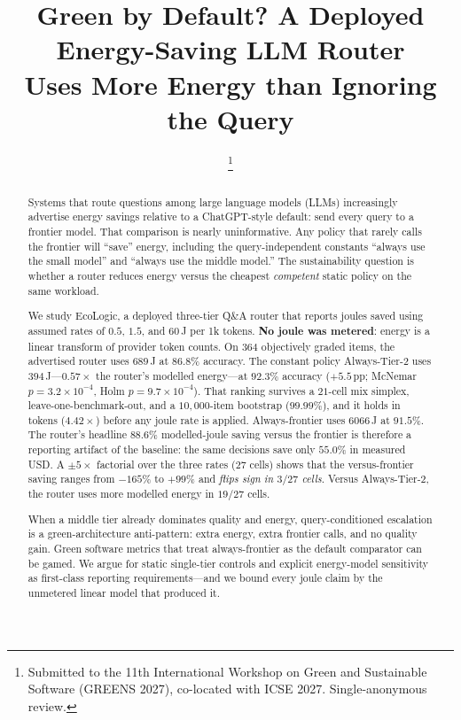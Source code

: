 \documentclass[10pt,conference]{IEEEtran}
\begin{document}
\title{Green by Default? A Deployed Energy-Saving LLM Router\\Uses More Energy than Ignoring the Query}

\author{
\thanks{Submitted to the 11th International Workshop on Green and Sustainable Software (GREENS 2027), co-located with ICSE 2027. Single-anonymous review.}}

\maketitle

\begin{abstract}
Systems that route questions among large language models (LLMs) increasingly advertise energy savings relative to a ChatGPT-style default: send every query to a frontier model. That comparison is nearly uninformative. Any policy that rarely calls the frontier will ``save'' energy, including the query-independent constants ``always use the small model'' and ``always use the middle model.'' The sustainability question is whether a router reduces energy versus the cheapest \emph{competent} static policy on the same workload.

We study EcoLogic, a deployed three-tier Q\&A router that reports joules saved using assumed rates of $0.5$, $1.5$, and $60$\,J per 1k tokens. \textbf{No joule was metered}: energy is a linear transform of provider token counts. On $364$ objectively graded items, the advertised router uses $689$\,J at $86.8\%$ accuracy. The constant policy Always-Tier-2 uses $394$\,J---$0.57\times$ the router's modelled energy---at $92.3\%$ accuracy ($+5.5$\,pp; McNemar $p=3.2\times10^{-4}$, Holm $p=9.7\times10^{-4}$). That ranking survives a $21$-cell mix simplex, leave-one-benchmark-out, and a $10{,}000$-item bootstrap ($99.99\%$), and it holds in tokens ($4.42\times$) before any joule rate is applied. Always-frontier uses $6066$\,J at $91.5\%$. The router's headline $88.6\%$ modelled-joule saving versus the frontier is therefore a reporting artifact of the baseline: the same decisions save only $55.0\%$ in measured USD. A $\pm5\times$ factorial over the three rates ($27$ cells) shows that the versus-frontier saving ranges from $-165\%$ to $+99\%$ and \emph{flips sign in $3/27$ cells}. Versus Always-Tier-2, the router uses more modelled energy in $19/27$ cells.

When a middle tier already dominates quality and energy, query-conditioned escalation is a green-architecture anti-pattern: extra energy, extra frontier calls, and no quality gain. Green software metrics that treat always-frontier as the default comparator can be gamed. We argue for static single-tier controls and explicit energy-model sensitivity as first-class reporting requirements---and we bound every joule claim by the unmetered linear model that produced it.
\end{abstract}
\end{document}
